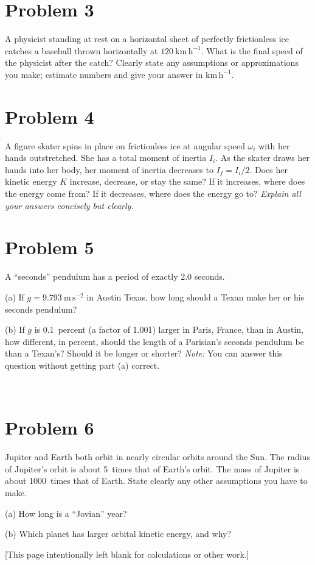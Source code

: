 \documentclass[12pt]{article}
\begin{document}
\clearpage

\section*{Problem 3}

A physicist standing at rest on a horizontal sheet of perfectly
frictionless ice catches a baseball thrown horizontally at
$120~\mathrm{km\,h^{-1}}$.  What is the final speed of the physicist
after the catch?  Clearly state any assumptions or approximations you
make; estimate numbers and give your answer in $\mathrm{km\,h^{-1}}$.

\clearpage

\section*{Problem 4}

A figure skater spins in place on frictionless ice at angular speed
$\omega_i$ with her hands outstretched.  She has a total moment of
inertia $I_i$.  As the skater draws her hands into her body, her
moment of inertia decreases to $I_f=I_i/2$.  Does her kinetic energy
$K$ increase, decrease, or stay the same?  If it increases, where does
the energy come from?  If it decreases, where does the energy go to?
\emph{Explain all your answers concisely but clearly.}

\clearpage

\section*{Problem 5}

A ``seconds'' pendulum has a period of exactly 2.0 seconds.

(a) If $g=9.793~\mathrm{m\,s^{-2}}$ in Austin Texas, how long should a
Texan make her or his seconds pendulum?

\vfill

(b) If $g$ is 0.1~percent (a factor of 1.001) larger in Paris, France,
than in Austin, how different, in percent, should the length of a
Parisian's seconds pendulum be than a Texan's?  Should it be longer or
shorter?  \emph{Note:} You can answer this question without getting
part (a) correct.

\vfill ~

\clearpage

\section*{Problem 6}

Jupiter and Earth both orbit in nearly circular orbits around the Sun.
The radius of Jupiter's orbit is about 5~times that of Earth's orbit.
The mass of Jupiter is about 1000~times that of Earth.  State clearly
any other assumptions you have to make.

(a) How long is a ``Jovian'' year?

\vfill

(b) Which planet has larger orbital kinetic energy, and why?

\vfill

\clearpage

[This page intentionally left blank for calculations or other work.]
\end{document}
